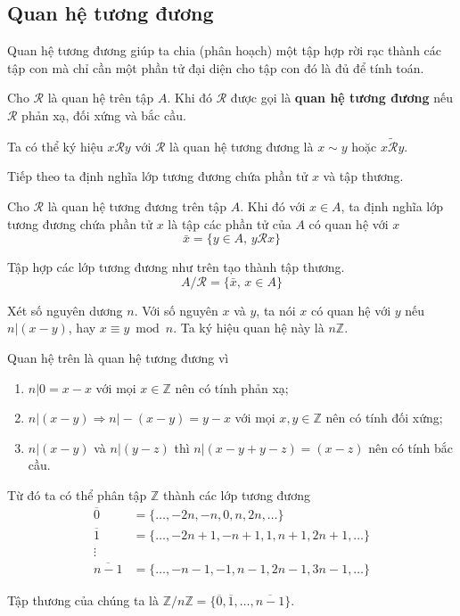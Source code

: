 \documentclass{mynotes}
\newcommand{\ZZ}{\mathbb{Z}}
\begin{document}
\subsection*{Quan hệ tương đương}

Quan hệ tương đương giúp ta chia (phân hoạch) một tập hợp rời rạc thành các tập con mà chỉ cần một phần tử đại diện cho tập con đó là đủ để tính toán.

\begin{definition}
    Cho $\mathcal{R}$ là quan hệ trên tập $A$. Khi đó $\mathcal{R}$ được gọi là \textbf{quan hệ tương đương} nếu $\mathcal{R}$ phản xạ, đối xứng và bắc cầu.

    Ta có thể ký hiệu $x \mathcal{R} y$ với $\mathcal{R}$ là quan hệ tương đương là $x \sim y$ hoặc $x \widetilde{\mathcal{R}} y$.
\end{definition}

Tiếp theo ta định nghĩa lớp tương đương chứa phần tử $x$ và tập thương.

\begin{definition}
    Cho $\mathcal{R}$ là quan hệ tương đương trên tập $A$. Khi đó với $x \in A$, ta định nghĩa lớp tương đương chứa phần tử $x$ là tập các phần tử của $A$ có quan hệ với $x$ \[ \bar{x} = \{ y \in A, \, y \mathcal{R} x \} \]
\end{definition}

\begin{definition}
    Tập hợp các lớp tương đương như trên tạo thành tập thương.
    \[A / \mathcal{R} = \{ \bar{x}, \, x \in A \}\]
\end{definition}

\begin{example}
    Xét số nguyên dương $n$. Với số nguyên $x$ và $y$, ta nói $x$ có quan hệ với $y$ nếu $n \vert (x - y)$, hay $x \equiv y \bmod n$. Ta ký hiệu quan hệ này là $n \ZZ$.

    Quan hệ trên là quan hệ tương đương vì
    \begin{enumerate}
        \item $n \vert 0 = x - x$ với mọi $x \in \ZZ$ nên có tính phản xạ;
        \item $n \vert (x - y) \Rightarrow n \vert -(x-y) = y-x$  với mọi $x, y \in \ZZ$ nên có tính đối xứng;
        \item $n \vert (x - y)$ và $n \vert (y - z)$ thì $n \vert (x - y + y - z) = (x - z)$ nên có tính bắc cầu.
    \end{enumerate}

    Từ đó ta có thể phân tập $\ZZ$ thành các lớp tương đương
    \begin{align*}
        \overline{0} & = \{ \ldots, -2n, -n, 0, n, 2n, \ldots \} \\
        \overline{1} & = \{ \ldots, -2n+1, -n+1, 1, n+1, 2n+1, \ldots \} \\
        \vdots \\
        \overline{n-1} & = \{ \ldots, -n-1, -1, n-1, 2n-1, 3n-1, \ldots \}
    \end{align*}

    Tập thương của chúng ta là $\ZZ / n\ZZ = \{ \overline{0}, \overline{1}, \ldots, \overline{n-1} \}$.
\end{example}
\end{document}
